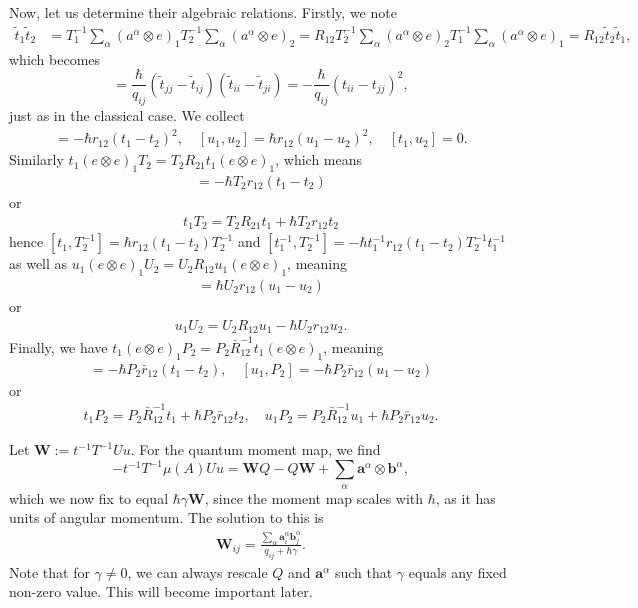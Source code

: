 \documentclass[11pt]{report}
\theoremstyle{definition}
\theoremstyle{remark}
\theoremstyle{remark}
\begin{document}
Now, let us determine their algebraic relations. Firstly, we note
\begin{align*}
\tilde t_1 \tilde t_2 &= T_1^{-1} \sum_\alpha (a^\alpha \otimes e)_1 T_2^{-1} \sum_\alpha (a^\alpha \otimes e)_2 = R_{12} T_2^{-1} \sum_\alpha (a^\alpha \otimes e)_2 T_1^{-1} \sum_\alpha (a^\alpha \otimes e)_1
= R_{12} \tilde t_2 \tilde t_1,
\end{align*}
which becomes
\begin{equation*}
[t_{ii},t_{jj}] = \frac{\hbar}{q_{ij}} (\tilde t_{jj}-\tilde t_{ij})(\tilde t_{ii}-\tilde t_{ji}) = -\frac{\hbar}{q_{ij}} (t_{ii}-t_{jj})^2,
\end{equation*}
just as in the classical case. We collect
\begin{align*}
[t_1,t_2] = -\hbar r_{12} (t_1-t_2)^2, \quad [u_1,u_2] = \hbar r_{12} (u_1-u_2)^2, \quad [t_1,u_2] = 0.
\end{align*}
Similarly $t_1 (e \otimes e)_1 T_2 = T_2 R_{21} t_1 (e \otimes e)_1$, which means
\begin{align*}
[t_1,T_2] = -\hbar T_2 r_{12} (t_1-t_2)
\end{align*}
or
\begin{align*}
t_1 T_2 = T_2 R_{21} t_1 + \hbar T_2 r_{12} t_2
\end{align*}
hence $[t_1,T_2^{-1}] = \hbar r_{12} (t_1-t_2) T_2^{-1}$ and $[t_1^{-1},T_2^{-1}] = -\hbar t_1^{-1} r_{12} (t_1-t_2) T_2^{-1} t_1^{-1}$ as well as $u_1 (e \otimes e)_1 U_2 = U_2 R_{12} u_1 (e \otimes e)_1$, meaning
\begin{align*}
[u_1,U_2] = \hbar U_2 r_{12} (u_1-u_2)
\end{align*}
or
\begin{align*}
u_1 U_2 = U_2 R_{12} u_1 - \hbar U_2 r_{12} u_2.
\end{align*}
Finally, we have $t_1 (e \otimes e)_1 P_2 = P_2 \bar R_{12}^{-1} t_1 (e \otimes e)_1$, meaning
\begin{align*}
[t_1,P_2] = -\hbar P_2 \bar r_{12} (t_1-t_2), \quad [u_1,P_2] = -\hbar P_2 \bar r_{12} (u_1-u_2)
\end{align*}
or
\begin{align*}
t_1 P_2 = P_2 \bar R_{12}^{-1} t_1 + \hbar P_2 \bar r_{12} t_2, \quad u_1 P_2 = P_2 \bar R_{12}^{-1} u_1 + \hbar P_2 \bar r_{12} u_2.
\end{align*}

Let $\mathbf{W} := t^{-1} T^{-1} U u$. For the quantum moment map, we find
\begin{equation*}
-t^{-1} T^{-1} \mu(A) U u = \mathbf{W} Q - Q \mathbf{W} + \sum_\alpha \mathbf{a}^\alpha \otimes \mathbf{b}^\alpha,
\end{equation*}
which we now fix to equal $\hbar \gamma \mathbf{W}$, since the moment map scales with $\hbar$, as it has units of angular momentum. The solution to this is
\begin{align*}
\mathbf{W}_{ij} = \frac{\sum_\alpha \mathbf{a}_i^\alpha \mathbf{b}_j^\alpha}{q_{ij}+\hbar\gamma}.
\end{align*}
Note that for $\gamma \neq 0$, we can always rescale $Q$ and $\mathbf{a}^\alpha$ such that $\gamma$ equals any fixed non-zero value. This will become important later.
\end{document}
